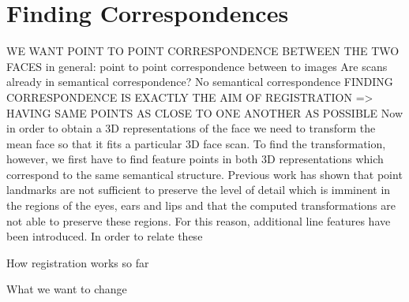 \section{Finding Correspondences}
WE WANT POINT TO POINT CORRESPONDENCE BETWEEN THE TWO FACES
in general: point to point correspondence between to images
Are scans already in semantical correspondence? No semantical correspondence
FINDING CORRESPONDENCE IS EXACTLY THE AIM OF REGISTRATION => HAVING SAME POINTS AS CLOSE TO ONE ANOTHER AS POSSIBLE
Now in order to obtain a 3D representations of the face we need to transform the mean face so that it fits a particular 3D face scan. To find the transformation, however, we first have to find feature points in both 3D representations which correspond to the same semantical structure. Previous work has shown that point landmarks are not sufficient to preserve the level of detail which is imminent in the regions of the eyes, ears and lips and that the computed transformations are not able to preserve these regions. For this reason, additional line features have been introduced. In order to relate these 

How registration works so far

What we want to change


